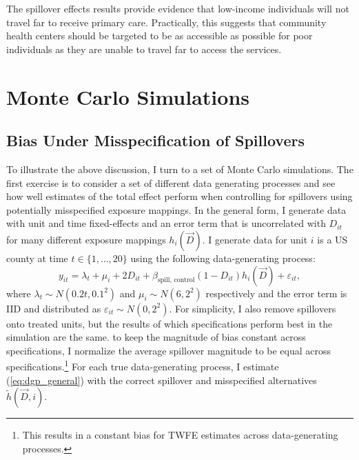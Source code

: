 \documentclass[11pt]{article}
\begin{document}
The spillover effects results provide evidence that low-income individuals will not travel far to receive primary care. Practically, this suggests that community health centers should be targeted to be as accessible as possible for poor individuals as they are unable to travel far to access the services. 




\section{Monte Carlo Simulations}

\subsection{Bias Under Misspecification of Spillovers}

To illustrate the above discussion, I turn to a set of Monte Carlo simulations. The first exercise is to consider a set of different data generating processes and see how well estimates of the total effect perform when controlling for spillovers using potentially misspecified exposure mappings. In the general form, I generate data with unit and time fixed-effects and an error term that is uncorrelated with $D_{it}$ for many different exposure mappings $h_i(\vec{D})$. I generate data for unit $i$ is a US county at time $t \in \{1, \dots, 20\}$ using the following data-generating process:
\begin{equation}\label{eq:dgp_general}
    y_{it} = \lambda_t + \mu_i + 2 D_{it} + \beta_{\text{spill, control}} (1-D_{it}) h_i(\vec{D}) + \varepsilon_{it},
\end{equation}
where $\lambda_t \sim N(0.2t, 0.1^2)$ and $\mu_i \sim N(6, 2^2)$ respectively and the error term is IID and distributed as $\varepsilon_{it} \sim N(0, 2^2)$. For simplicity, I also remove spillovers onto treated units, but the results of which specifications perform best in the simulation are the same. to keep the magnitude of bias constant across specifications, I normalize the average spillover magnitude to be equal across specifications.\footnote{This results in a constant bias for TWFE estimates across data-generating processes.} For each true data-generating process, I estimate (\ref{eq:dgp_general}) with the correct spillover and misspecified alternatives $\tilde{h}(\vec{D}, i)$. 
\end{document}
